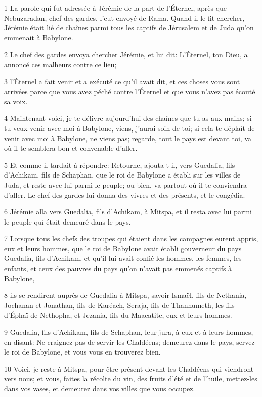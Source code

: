 \par 1 La parole qui fut adressée à Jérémie de la part de l'Éternel, après que Nebuzaradan, chef des gardes, l'eut envoyé de Rama. Quand il le fit chercher, Jérémie était lié de chaînes parmi tous les captifs de Jérusalem et de Juda qu'on emmenait à Babylone.
\par 2 Le chef des gardes envoya chercher Jérémie, et lui dit: L'Éternel, ton Dieu, a annoncé ces malheurs contre ce lieu;
\par 3 l'Éternel a fait venir et a exécuté ce qu'il avait dit, et ces choses vous sont arrivées parce que vous avez péché contre l'Éternel et que vous n'avez pas écouté sa voix.
\par 4 Maintenant voici, je te délivre aujourd'hui des chaînes que tu as aux mains; si tu veux venir avec moi à Babylone, viens, j'aurai soin de toi; si cela te déplaît de venir avec moi à Babylone, ne viens pas; regarde, tout le pays est devant toi, va où il te semblera bon et convenable d'aller.
\par 5 Et comme il tardait à répondre: Retourne, ajouta-t-il, vers Guedalia, fils d'Achikam, fils de Schaphan, que le roi de Babylone a établi sur les villes de Juda, et reste avec lui parmi le peuple; ou bien, va partout où il te conviendra d'aller. Le chef des gardes lui donna des vivres et des présents, et le congédia.
\par 6 Jérémie alla vers Guedalia, fils d'Achikam, à Mitspa, et il resta avec lui parmi le peuple qui était demeuré dans le pays.
\par 7 Lorsque tous les chefs des troupes qui étaient dans les campagnes eurent appris, eux et leurs hommes, que le roi de Babylone avait établi gouverneur du pays Guedalia, fils d'Achikam, et qu'il lui avait confié les hommes, les femmes, les enfants, et ceux des pauvres du pays qu'on n'avait pas emmenés captifs à Babylone,
\par 8 ils se rendirent auprès de Guedalia à Mitspa, savoir Ismaël, fils de Nethania, Jochanan et Jonathan, fils de Karéach, Seraja, fils de Thanhumeth, les fils d'Éphaï de Nethopha, et Jezania, fils du Maacatite, eux et leurs hommes.
\par 9 Guedalia, fils d'Achikam, fils de Schaphan, leur jura, à eux et à leurs hommes, en disant: Ne craignez pas de servir les Chaldéens; demeurez dans le pays, servez le roi de Babylone, et vous vous en trouverez bien.
\par 10 Voici, je reste à Mitspa, pour être présent devant les Chaldéens qui viendront vers nous; et vous, faites la récolte du vin, des fruits d'été et de l'huile, mettez-les dans vos vases, et demeurez dans vos villes que vous occupez.

